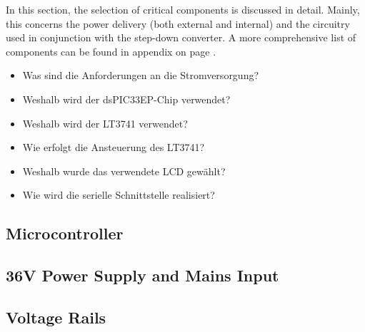 In  this  section,  the  selection  of critical  components  is  discussed  in
detail. Mainly, this concerns the power  delivery (both external and internal)
and the  circuitry used  in conjunction with  the step-down  converter. A more
comprehensive list of components can be  found in appendix  on page
.

\begin{itemize}
    \item
        Was sind die Anforderungen an die Stromversorgung?
    \item
        Weshalb wird der dsPIC33EP-Chip verwendet?
    \item
        Weshalb wird der LT3741 verwendet?
    \item
        Wie erfolgt die Ansteuerung des LT3741?
    \item
        Weshalb wurde das verwendete LCD gew\"ahlt?
    \item
        Wie wird die serielle Schnittstelle realisiert?
\end{itemize}

\subsection{Microcontroller}



\subsection{36V Power Supply and Mains Input}



\subsection{Voltage Rails}



